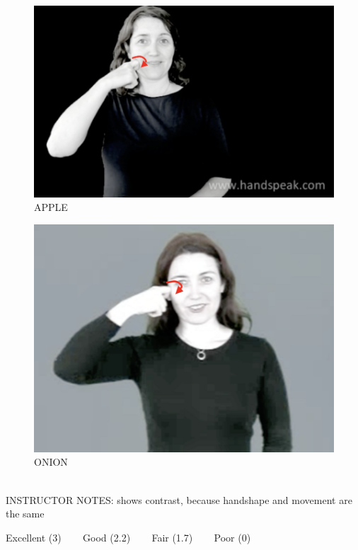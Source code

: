 \documentclass[12pt]{article}
\begin{document}
\begin{figure}[H]
\includegraphics{../images/asl_apple.png}
\caption{APPLE}
\end{figure}
\begin{figure}[H]
\includegraphics{../images/asl_onion.png}
\caption{ONION}
\end{figure}

~\\
INSTRUCTOR NOTES: shows contrast, because handshape and movement are the same


\vfill
Excellent (3) ~~~ Good (2.2) ~~~ Fair (1.7) ~~~ Poor (0)
\newpage

\begin{center}
\textbf{{\color{red}{\HUGE END OF EXAM}}}\\

\end{center}
\newpage
\end{document}
